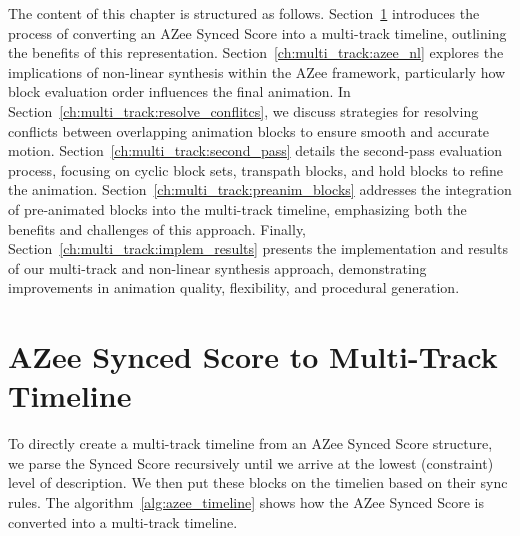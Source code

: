 \documentclass[../../main.tex]{subfiles}
\begin{document}
The content of this chapter is structured as follows. Section~\ref{ch:multi_track:score_to_timeline} introduces the process of converting an AZee Synced Score into a multi-track timeline, outlining the benefits of this representation. Section~\ref{ch:multi_track:azee_nl} explores the implications of non-linear synthesis within the AZee framework, particularly how block evaluation order influences the final animation. In Section~\ref{ch:multi_track:resolve_conflitcs}, we discuss strategies for resolving conflicts between overlapping animation blocks to ensure smooth and accurate motion. Section~\ref{ch:multi_track:second_pass} details the second-pass evaluation process, focusing on cyclic block sets, transpath blocks, and hold blocks to refine the animation. Section~\ref{ch:multi_track:preanim_blocks} addresses the integration of pre-animated blocks into the multi-track timeline, emphasizing both the benefits and challenges of this approach. Finally, Section~\ref{ch:multi_track:implem_results} presents the implementation and results of our multi-track and non-linear synthesis approach, demonstrating improvements in animation quality, flexibility, and procedural generation.

\section{AZee Synced Score to Multi-Track Timeline}
\label{ch:multi_track:score_to_timeline}

To directly create a multi-track timeline from an AZee Synced Score structure, we parse the Synced Score recursively until we arrive at the lowest (constraint) level of description. We then put these blocks on the timelien based on their sync rules. The algorithm~\ref{alg:azee_timeline} shows how the AZee Synced Score is converted into a multi-track timeline.
\end{document}
